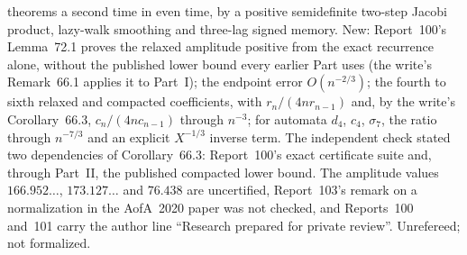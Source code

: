 \documentclass[11pt]{article}
\begin{document}
{theorems a second time in even time, by a positive semidefinite two-step
Jacobi product, lazy-walk smoothing and three-lag signed memory.  New:
Report~100's Lemma~72.1 proves the relaxed amplitude positive from the
exact recurrence alone, without the published lower bound every earlier
Part uses (the write's Remark~66.1 applies it to Part~I); the endpoint
error $O(n^{-2/3})$; the fourth to sixth relaxed and compacted
coefficients, with $r_n/(4nr_{n-1})$ and, by the write's Corollary~66.3,
$c_n/(4nc_{n-1})$ through $n^{-3}$; for automata $d_4$, $c_4$,
$\sigma_7$, the ratio through $n^{-7/3}$ and an explicit $X^{-1/3}$
inverse term.  The independent check stated two dependencies of
Corollary~66.3: Report~100's exact certificate suite and, through Part~II,
the published compacted lower bound.  The amplitude values
$166.952\ldots$, $173.127\ldots$ and $76.438$ are uncertified, Report~103's
remark on a normalization in the AofA~2020 paper was not checked, and
Reports~100 and~101 carry the author line ``Research prepared for private
review''.  Unrefereed; not formalized.}
\end{document}
